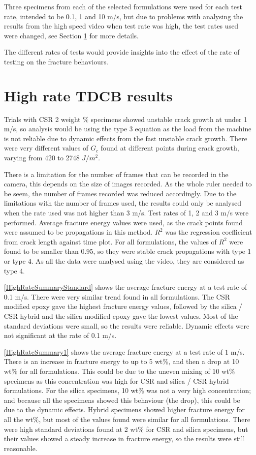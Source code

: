 \documentclass[numbers=noendperiod,chapterprefix=on]{icldt} %
\begin{document}
Three specimens from each of the selected formulations were used for each test rate, intended to be 0.1, 1 and 10 m/s, but due to problems with analysing the results from the high speed video when test rate was high, the test rates used were changed, see Section \ref{HT_TDCB_results} for more details.

The different rates of tests would provide insights into the effect of the rate of testing on the fracture behaviours.

\section{High rate TDCB results} \label{HT_TDCB_results}
Trials with CSR 2 weight \% specimens showed unstable crack growth at under 1 m/s, so analysis would be using the type 3 equation as the load from the machine is not reliable due to dynamic effects from the fast unstable crack growth. There were very different values of $G_c$ found at different points during crack growth, varying from 420 to 2748 $J/m^2.$ 

There is a limitation for the number of frames that can be recorded in the camera, this depends on the size of images recorded. As the whole ruler needed to be seem, the number of frames recorded was reduced accordingly.
Due to the limitations with the number of frames used, the results could only be analysed when the rate used was not higher than 3 m/s. Test rates of 1, 2 and 3 m/s were performed. Average fracture energy values were used, as the crack points found were assumed to be propagations in this method. 
$ R^{2} $ was the regression coefficient from crack length against time plot.
For all formulations, the values of $ R^{2} $ were found to be smaller than 0.95, so they were stable crack propagations with type 1 or type 4. As all the data were analysed using the video, they are considered as type 4.

\ref{HighRateSummaryStandard} shows the average fracture energy at a test rate of 0.1 m/s. There were very similar trend found in all formulations. The CSR modified epoxy gave the highest fracture energy values, followed by the silica / CSR hybrid and the silica modified epoxy gave the lowest values. Most of the standard deviations were small, so the results were reliable. Dynamic effects were not significant at the rate of 0.1 m/s. 

\ref{HighRateSummary1} shows the average fracture energy at a  test rate of 1 m/s. There is an increase in fracture energy to up to 5 wt\%, and then a drop at 10 wt\% for all formulations. This could be due to the uneven mixing of 10 wt\% specimens as this concentration was high for CSR and silica / CSR hybrid formulations. For the silica specimens, 10 wt\% was not a very high concentration; and because all the specimens showed this behaviour (the drop), this could be due to the dynamic effects.
Hybrid specimens showed higher fracture energy for all the wt\%, but most of the values found were similar for all formulations. There were high standard deviations found at 2 wt\% for CSR and silica specimens, but their values showed a  steady increase in fracture energy, so the results were still reasonable.
\end{document}
